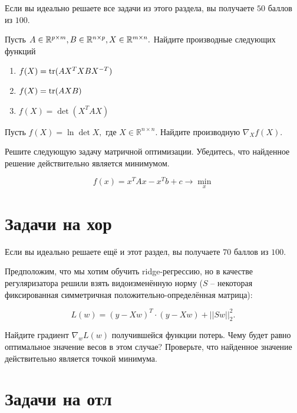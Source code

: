 \documentclass[12pt, a4paper, oneside]{article}
\begin{document}
Если вы идеально решаете все задачи из этого раздела, вы получаете $50$ баллов из $100$.

\begin{problem}{30}
    Пусть $A \in \mathbb R^{p \times m}, B \in \mathbb R^{n \times p}, X  \in \mathbb R^{m \times n}.$ Найдите производные следующих функций
    
    \begin{enumerate}
        \item  $f(X) = \operatorname{tr}(AX^TXBX^{-T})$
        \item  $f(X) = \operatorname{tr}(AXB)$
        \item  $f(X) = \det(X^TAX)$
    \end{enumerate}
\end{problem}

\begin{problem}{10}
    Пусть $f(X) = \ln \det X,$ где $X \in \mathbb{R}^{n\times n}$. Найдите производную $\nabla_X f(X)$.
\end{problem}

\begin{problem}{10}
Решите следующую задачу матричной оптимизации. Убедитесь, что найденное решение действительно является минимумом. 

\[
f(x) = x^T A x - x^Tb + c \to \min_{x}
\]
\end{problem}


\section*{Задачи на хор}

Если вы идеально решаете ещё и этот раздел, вы получаете $70$ баллов из $100$.

\begin{problem}{20}
    Предположим, что мы хотим обучить ridge-регрессию, но в качестве регуляризатора решили взять видоизменённую норму ($S$ -- некоторая фиксированная симметричная положительно-определённая матрица):
    
    \[
    L(w) = (y - Xw)^T \cdot (y-Xw) + ||Sw||^2_2.
    \]
    
    Найдите градиент $\nabla_w L(w)$ получившейся функции потерь. Чему будет равно оптимальное значение весов в этом случае? Проверьте, что найденное значение действительно является точкой минимума. 
\end{problem}


\section*{Задачи на отл}
\end{document}
